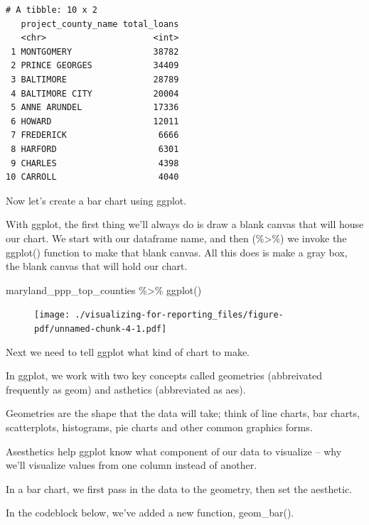 \documentclass[
  letterpaper,
  DIV=11,
  numbers=noendperiod]{scrreprt}
\newenvironment{Shaded}{\begin{snugshade}}{\end{snugshade}}
\newcommand{\FunctionTok}[1]{\textcolor[rgb]{0.28,0.35,0.67}{#1}}
\newcommand{\NormalTok}[1]{\textcolor[rgb]{0.00,0.23,0.31}{#1}}
\newcommand{\SpecialCharTok}[1]{\textcolor[rgb]{0.37,0.37,0.37}{#1}}
\begin{document}
\begin{verbatim}
# A tibble: 10 x 2
   project_county_name total_loans
   <chr>                     <int>
 1 MONTGOMERY                38782
 2 PRINCE GEORGES            34409
 3 BALTIMORE                 28789
 4 BALTIMORE CITY            20004
 5 ANNE ARUNDEL              17336
 6 HOWARD                    12011
 7 FREDERICK                  6666
 8 HARFORD                    6301
 9 CHARLES                    4398
10 CARROLL                    4040
\end{verbatim}

Now let's create a bar chart using ggplot.

With ggplot, the first thing we'll always do is draw a blank canvas that
will house our chart. We start with our dataframe name, and then
(\%\textgreater\%) we invoke the ggplot() function to make that blank
canvas. All this does is make a gray box, the blank canvas that will
hold our chart.

\begin{Shaded}
\begin{Highlighting}[]
\NormalTok{maryland\_ppp\_top\_counties }\SpecialCharTok{\%\textgreater{}\%}
  \FunctionTok{ggplot}\NormalTok{()}
\end{Highlighting}
\end{Shaded}

\begin{figure}[H]

{\centering \texttt{[image: ./visualizing-for-reporting\_files/figure-pdf/unnamed-chunk-4-1.pdf]}

}

\end{figure}

Next we need to tell ggplot what kind of chart to make.

In ggplot, we work with two key concepts called geometries (abbreivated
frequently as geom) and asthetics (abbreviated as aes).

Geometries are the shape that the data will take; think of line charts,
bar charts, scatterplots, histograms, pie charts and other common
graphics forms.

Asesthetics help ggplot know what component of our data to visualize --
why we'll visualize values from one column instead of another.

In a bar chart, we first pass in the data to the geometry, then set the
aesthetic.

In the codeblock below, we've added a new function, geom\_bar().
\end{document}

